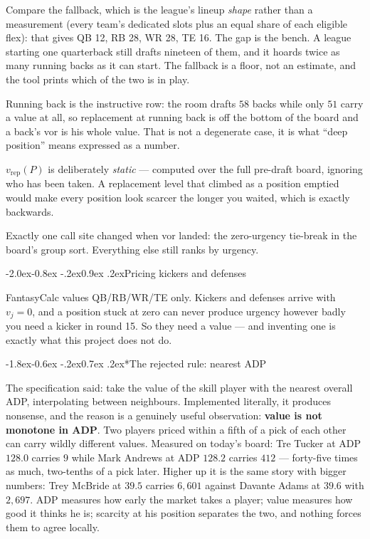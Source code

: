 \documentclass[10pt,a4paper]{article}
\makeatletter
\theoremstyle{plain}
\theoremstyle{definition}
\theoremstyle{remark}
\renewcommand\subsection{\@startsection{subsection}{2}{\z@}%
  {-2.0ex\@plus -0.8ex \@minus -.2ex}{0.9ex \@plus .2ex}{\normalfont\large\bfseries}}
\renewcommand\subsubsection{\@startsection{subsubsection}{3}{\z@}%
  {-1.8ex\@plus -0.6ex \@minus -.2ex}{0.7ex \@plus .2ex}{\normalfont\normalsize\bfseries}}
\makeatother
\begin{document}
Compare the fallback, which is the league's lineup \emph{shape} rather than a measurement
(every team's dedicated slots plus an equal share of each eligible flex): that gives
QB 12, RB 28, WR 28, TE 16. The gap is the bench. A league starting one quarterback
still drafts nineteen of them, and it hoards twice as many running backs as it can start.
The fallback is a floor, not an estimate, and the tool prints which of the two is in play.

Running back is the instructive row: the room drafts $58$ backs while only $51$ carry a
value at all, so replacement at running back is off the bottom of the board and a back's
vor is his whole value. That is not a degenerate case, it is what ``deep position'' means
expressed as a number.

$v_{\mathrm{rep}}(P)$ is deliberately \emph{static} --- computed over the full pre-draft board, ignoring
who has been taken. A replacement level that climbed as a position emptied would make
every position look scarcer the longer you waited, which is exactly backwards.

Exactly one call site changed when vor landed: the zero-urgency tie-break in the board's
group sort. Everything else still ranks by urgency.

\subsection{Pricing kickers and defenses}
\label{sec:kdef}

FantasyCalc values QB/RB/WR/TE only. Kickers and defenses arrive with $v_j = 0$, and a
position stuck at zero can never produce urgency however badly you need a kicker in round
15. So they need a value --- and inventing one is exactly what this project does not do.

\subsubsection*{The rejected rule: nearest ADP}

The specification said: take the value of the skill player with the nearest overall ADP,
interpolating between neighbours. Implemented literally, it produces nonsense, and the
reason is a genuinely useful observation: \textbf{value is not monotone in ADP}. Two
players priced within a fifth of a pick of each other can carry wildly different values.
Measured on today's board: Tre Tucker at ADP $128.0$ carries $9$ while Mark Andrews at
ADP $128.2$ carries $412$ --- forty-five times as much, two-tenths of a pick later. Higher
up it is the same story with bigger numbers: Trey McBride at $39.5$ carries $6{,}601$
against Davante Adams at $39.6$ with $2{,}697$. ADP measures how early the market takes a
player; value measures how good it thinks he is; scarcity at his position separates the
two, and nothing forces them to agree locally.
\end{document}
